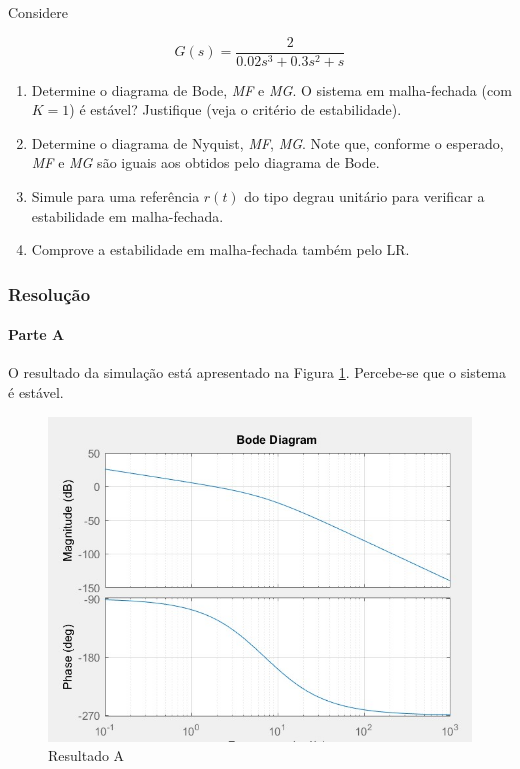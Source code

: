 \documentclass[
]{book}
\providecommand{\tightlist}{%
  \setlength{\itemsep}{0pt}\setlength{\parskip}{0pt}}
\theoremstyle{definition}
\theoremstyle{definition}
\theoremstyle{definition}
\theoremstyle{remark}
\begin{document}
Considere

\[
G(s) = \frac{2}{0.02s^3+0.3s^2+s}
\]

\begin{enumerate}
\def\labelenumi{\alph{enumi}.}
\tightlist
\item
  Determine o diagrama de Bode, \emph{MF} e \emph{MG}. O sistema em malha-fechada (com \(K=1\)) é estável? Justifique (veja o critério de estabilidade).
\item
  Determine o diagrama de Nyquist, \emph{MF}, \emph{MG}. Note que, conforme o esperado, \emph{MF} e \emph{MG} são iguais aos obtidos pelo diagrama de Bode.
\item
  Simule para uma referência \(r(t)\) do tipo degrau unitário para verificar a estabilidade em malha-fechada.
\item
  Comprove a estabilidade em malha-fechada também pelo LR.
\end{enumerate}

\hypertarget{resoluuxe7uxe3o-34}{%
\subsubsection*{Resolução}\label{resoluuxe7uxe3o-34}}

\hypertarget{parte-a-13}{%
\paragraph{Parte A}\label{parte-a-13}}

O resultado da simulação está apresentado na Figura \ref{fig:fig10RA1}. Percebe-se que o sistema é estável.

\begin{figure}

{\centering \includegraphics[width=0.5\linewidth]{Imagens/Lab10/Resolução/fig1} 

}

\caption{Resultado A}\label{fig:fig10RA1}
\end{figure}
\end{document}
